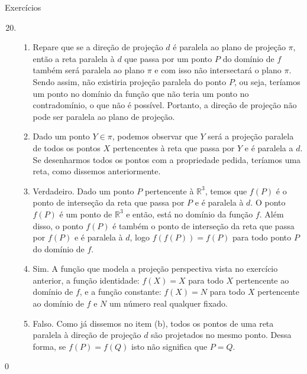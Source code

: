 \begin{answer}{Exercícios}
{\exerciselist
\begin{enumerate}\setcounter{enumi}{19}
\item \begin{enumerate}
\item {} 
Repare que se a direção de projeção \(d\) é paralela ao plano de projeção \(\pi\), então a reta paralela à \(d\) que passa por um ponto \(P\) do domínio de \(f\) também será paralela ao plano \(\pi\) e com isso não intersectará o plano \(\pi\). Sendo assim, não existiria projeção paralela do ponto \(P\), ou seja, teríamos um ponto no domínio da função que não teria um ponto no contradomínio, o que não é possível. Portanto, a direção de projeção não pode ser paralela ao plano de projeção.

\item {} 
Dado um ponto \(Y\in\pi\), podemos observar que \(Y\) será a projeção paralela de todos os pontos \(X\) pertencentes à reta que passa por \(Y\) e é paralela a \(d\). Se desenharmos todos os pontos com a propriedade pedida, teríamos uma reta, como dissemos anteriormente.

\item {} 
Verdadeiro. Dado um ponto \(P\) pertencente à \({\mathbb R}^{3}\), temos que \(f(P)\) é o ponto de interseção da reta que passa por \(P\) e é paralela à \(d\). O ponto \(f(P)\) é um ponto de \({\mathbb R}^{3}\) e então, está no domínio da função \(f\). Além disso, o ponto \(f(P)\) é também o ponto de interseção da reta que passa por \(f(P)\) e é paralela à \(d\), logo \(f(f(P)) = f(P)\) para todo ponto \(P\) do domínio de \(f\).

\item {} 
Sim. A função que modela a projeção perspectiva vista no exercício anterior, a função identidade: \(f(X)=X\) para todo \(X\) pertencente ao domínio de \(f\),  e a função constante: \(f(X)=N\) para todo \(X\) pertencente ao domínio de \(f\) e \(N\) um número real qualquer fixado.

\item {} 
Falso. Como já dissemos no item (b), todos os pontos de uma reta paralela à direção de projeção \(d\) são projetados no mesmo ponto. Dessa forma, se \(f(P)=f(Q)\) isto não significa que \(P=Q\).

\end{enumerate}
\end{enumerate}
}{0}
\end{answer}
\clearmargin

